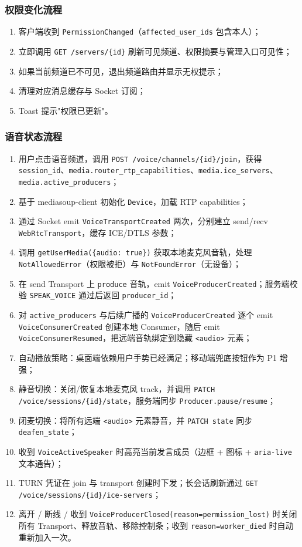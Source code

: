 \subsubsection{权限变化流程}
\begin{enumerate}
  \item 客户端收到 \texttt{PermissionChanged}（\texttt{affected\_user\_ids} 包含本人）；
  \item 立即调用 \texttt{GET /servers/\{id\}} 刷新可见频道、权限摘要与管理入口可见性；
  \item 如果当前频道已不可见，退出频道路由并显示无权提示；
  \item 清理对应消息缓存与 Socket 订阅；
  \item Toast 提示"权限已更新"。
\end{enumerate}

\subsubsection{语音状态流程}
\begin{enumerate}
  \item 用户点击语音频道，调用 \texttt{POST /voice/channels/\{id\}/join}，获得 \texttt{session\_id}、\texttt{media.router\_rtp\_capabilities}、\texttt{media.ice\_servers}、\texttt{media.active\_producers}；
  \item 基于 mediasoup-client 初始化 \texttt{Device}，加载 RTP capabilities；
  \item 通过 Socket emit \texttt{VoiceTransportCreated} 两次，分别建立 send/recv \texttt{WebRtcTransport}，缓存 ICE/DTLS 参数；
  \item 调用 \texttt{getUserMedia(\{audio: true\})} 获取本地麦克风音轨，处理 \texttt{NotAllowedError}（权限被拒）与 \texttt{NotFoundError}（无设备）；
  \item 在 send Transport 上 \texttt{produce} 音轨，emit \texttt{VoiceProducerCreated}；服务端校验 \texttt{SPEAK\_VOICE} 通过后返回 \texttt{producer\_id}；
  \item 对 \texttt{active\_producers} 与后续广播的 \texttt{VoiceProducerCreated} 逐个 emit \texttt{VoiceConsumerCreated} 创建本地 Consumer，随后 emit \texttt{VoiceConsumerResumed}，把远端音轨绑定到隐藏 \texttt{<audio>} 元素；
  \item 自动播放策略：桌面端依赖用户手势已经满足；移动端兜底按钮作为 P1 增强；
  \item 静音切换：关闭/恢复本地麦克风 track，并调用 \texttt{PATCH /voice/sessions/\{id\}/state}，服务端同步 \texttt{Producer.pause/resume}；
  \item 闭麦切换：将所有远端 \texttt{<audio>} 元素静音，并 \texttt{PATCH state} 同步 \texttt{deafen\_state}；
  \item 收到 \texttt{VoiceActiveSpeaker} 时高亮当前发言成员（边框 + 图标 + \texttt{aria-live} 文本通告）；
  \item TURN 凭证在 join 与 transport 创建时下发；长会话刷新通过 \texttt{GET /voice/sessions/\{id\}/ice-servers}；
  \item 离开 / 断线 / 收到 \texttt{VoiceProducerClosed(reason=permission\_lost)} 时关闭所有 Transport、释放音轨、移除控制条；收到 \texttt{reason=worker\_died} 时自动重新加入一次。
\end{enumerate}

